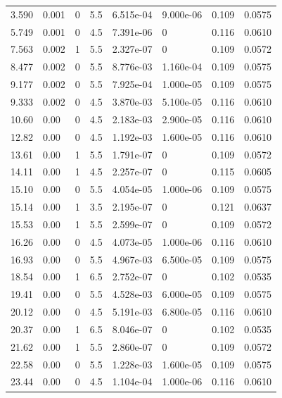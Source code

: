 \documentclass[preview]{standalone}
\begin{document}
{{\begin{tabular}{L{1.2cm}C{1.2cm} C{0.3cm}C{0.5cm} C{1.4cm}C{1.4cm} C{1.4cm}C{1.4cm}}
  3.590  &  0.001  & 0     & 5.5 &  6.515e-04  & 9.000e-06  & 0.109 &  0.0575   \\ 
  5.749  &  0.001  & 0     & 4.5 &  7.391e-06  & 0  & 0.116 &  0.0610   \\ 
  7.563  &  0.002  & 1     & 5.5 &  2.327e-07  & 0  & 0.109 &  0.0572   \\ 
  8.477  &  0.002  & 0     & 5.5 &  8.776e-03  & 1.160e-04  & 0.109 &  0.0575   \\ 
  9.177  &  0.002  & 0     & 5.5 &  7.925e-04  & 1.000e-05  & 0.109 &  0.0575   \\ 
  9.333  &  0.002  & 0     & 4.5 &  3.870e-03  & 5.100e-05  & 0.116 &  0.0610   \\ 
  10.60  &  0.00  & 0     & 4.5 &  2.183e-03  & 2.900e-05  & 0.116 &  0.0610   \\ 
  12.82  &  0.00  & 0     & 4.5 &  1.192e-03  & 1.600e-05  & 0.116 &  0.0610   \\ 
  13.61  &  0.00  & 1     & 5.5 &  1.791e-07  & 0  & 0.109 &  0.0572   \\ 
  14.11  &  0.00  & 1     & 4.5 &  2.257e-07  & 0  & 0.115 &  0.0605   \\ 
  15.10  &  0.00  & 0     & 5.5 &  4.054e-05  & 1.000e-06  & 0.109 &  0.0575   \\ 
  15.14  &  0.00  & 1     & 3.5 &  2.195e-07  & 0  & 0.121 &  0.0637   \\ 
  15.53  &  0.00  & 1     & 5.5 &  2.599e-07  & 0  & 0.109 &  0.0572   \\ 
  16.26  &  0.00  & 0     & 4.5 &  4.073e-05  & 1.000e-06  & 0.116 &  0.0610   \\ 
  16.93  &  0.00  & 0     & 5.5 &  4.967e-03  & 6.500e-05  & 0.109 &  0.0575   \\ 
  18.54  &  0.00  & 1     & 6.5 &  2.752e-07  & 0  & 0.102 &  0.0535   \\ 
  19.41  &  0.00  & 0     & 5.5 &  4.528e-03  & 6.000e-05  & 0.109 &  0.0575   \\ 
  20.12  &  0.00  & 0     & 4.5 &  5.191e-03  & 6.800e-05  & 0.116 &  0.0610   \\ 
  20.37  &  0.00  & 1     & 6.5 &  8.046e-07  & 0  & 0.102 &  0.0535   \\ 
  21.62  &  0.00  & 1     & 5.5 &  2.860e-07  & 0  & 0.109 &  0.0572   \\ 
  22.58  &  0.00  & 0     & 5.5 &  1.228e-03  & 1.600e-05  & 0.109 &  0.0575   \\ 
  23.44  &  0.00  & 0     & 4.5 &  1.104e-04  & 1.000e-06  & 0.116 &  0.0610   \\ 

\end{tabular}}}
\end{document}
